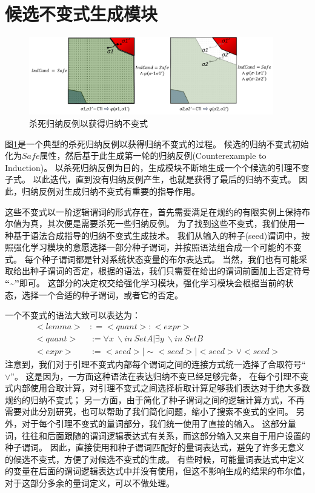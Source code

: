 \section{候选不变式生成模块}

\begin{figure}[h]
    \centering
    \includegraphics[width=0.95\textwidth]{figures/eliminate_cti.pdf}
    \caption{杀死归纳反例以获得归纳不变式}
    \label{fig:eliminate_cti}
\end{figure}

图\ref{fig:eliminate_cti}是一个典型的杀死归纳反例以获得归纳不变式的过程。
候选的归纳不变式初始化为$Safe$属性，然后基于此生成第一轮的归纳反例(Counterexample to Induction)。
以杀死归纳反例为目的，生成模块不断地生成一个个候选的引理不变子式。
以此迭代，直到没有归纳反例产生，也就是获得了最后的归纳不变式。
因此，归纳反例对生成归纳不变式有重要的指导作用。

这些不变式以一阶逻辑谓词的形式存在，首先需要满足在规约的有限实例上保持布尔值为真，其次便是需要杀死一些归纳反例。
为了找到这些不变式，我们使用一种基于语法合成指导的归纳不变式生成技术。
我们从输入的种子(seed)谓词中，按照强化学习模块的意愿选择一部分种子谓词，并按照语法组合成一个可能的不变式。
每个种子谓词都是针对系统状态变量的布尔表达式。
当然，我们也有可能采取给出种子谓词的否定，根据\TLA 的语法，我们只需要在给出的谓词前面加上否定符号 \textbf{“\~{}”}即可。
这部分的决定权交给强化学习模块，强化学习模块会根据当前的状态，选择一个合适的种子谓词，或者它的否定。

一个不变式的语法大致可以表达为：
\begin{align}
    <lemma> &: = <quant>:<expr>   \\
    <quant> &:= \forall x\ \backslash in\ SetA | \exists y\ \backslash in\ SetB \\
    <expr>  &:= <seed>| \sim<seed> | <seed> \lor <seed>
\end{align}
注意到，我们对于引理不变式内部每个谓词之间的连接方式统一选择了合取符号“$\lor$”。
这是因为，一方面这种语法在表达归纳不变已经足够完备\cite{or-complete}，
在每个引理不变式内部使用合取计算，对引理不变式之间选择析取计算足够我们表达对于绝大多数规约的归纳不变式；
另一方面，由于简化了种子谓词之间的逻辑计算方式，不再需要对此分别研究，也可以帮助了我们简化问题，缩小了搜索不变式的空间。
另外，对于每个引理不变式的量词部分，我们统一使用了直接的输入。
这部分量词，往往和后面跟随的谓词逻辑表达式有关系，而这部分输入又来自于用户设置的种子谓词。
因此，直接使用和种子谓词匹配好的量词表达式，避免了许多无意义的候选不变式，方便了对候选不变式的生成。
有些时候，可能量词表达式中定义的变量在后面的谓词逻辑表达式中并没有使用，但这不影响生成的结果的布尔值，对于这部分多余的量词定义，可以不做处理。


